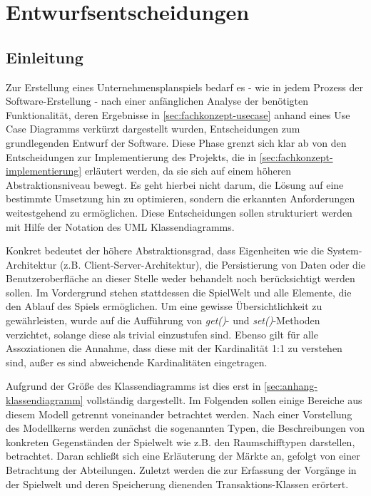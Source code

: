 \section{Entwurfsentscheidungen}
\label{sec:fachkonzept-entwurf}


\subsection{Einleitung}
Zur Erstellung eines Unternehmensplanspiels bedarf es - wie in jedem Prozess der Software-Erstellung - nach einer anfänglichen Analyse der benötigten Funktionalität, deren Ergebnisse in \ref{sec:fachkonzept-usecase} anhand eines Use Case Diagramms verkürzt dargestellt wurden, Entscheidungen zum grundlegenden Entwurf der Software. Diese Phase grenzt sich klar ab von den Entscheidungen zur Implementierung des Projekts, die in \ref{sec:fachkonzept-implementierung} erläutert werden, da sie sich auf einem höheren Abstraktionsniveau bewegt. Es geht hierbei nicht darum, die Lösung auf eine bestimmte Umsetzung hin zu optimieren, sondern die erkannten Anforderungen weitestgehend zu ermöglichen. Diese Entscheidungen sollen strukturiert werden mit Hilfe der Notation des UML Klassendiagramms.

Konkret bedeutet der höhere Abstraktionsgrad, dass Eigenheiten wie die System-Architektur (z.B. Client-Server-Architektur), die Persistierung von Daten oder die Benutzeroberfläche an dieser Stelle weder behandelt noch berücksichtigt werden sollen. Im Vordergrund stehen stattdessen die SpielWelt und alle Elemente, die den Ablauf des Spiels ermöglichen. Um eine gewisse Übersichtlichkeit zu gewährleisten, wurde auf die Aufführung von \textit{get()}- und \textit{set()}-Methoden verzichtet, solange diese als trivial einzustufen sind. Ebenso gilt für alle Assoziationen die Annahme, dass diese mit der Kardinalität 1:1 zu verstehen sind, außer es sind abweichende Kardinalitäten eingetragen.

Aufgrund der Größe des Klassendiagramms ist dies erst in \vref{sec:anhang-klassendiagramm} vollständig dargestellt. Im Folgenden sollen einige Bereiche aus diesem Modell getrennt voneinander betrachtet werden. Nach einer Vorstellung des Modellkerns werden zunächst die sogenannten Typen, die Beschreibungen von konkreten Gegenständen der Spielwelt wie z.B. den Raumschifftypen darstellen, betrachtet. Daran schließt sich eine Erläuterung der Märkte an, gefolgt von einer Betrachtung der Abteilungen. Zuletzt werden die zur Erfassung der Vorgänge in der Spielwelt und deren Speicherung dienenden Transaktions-Klassen erörtert.

